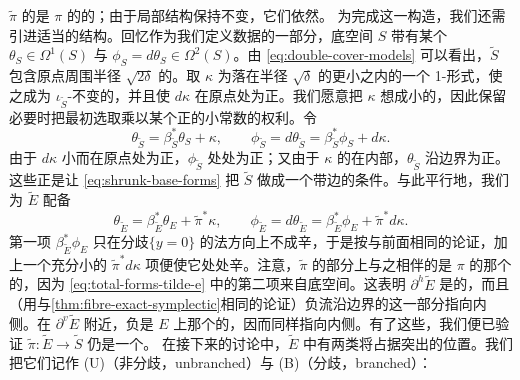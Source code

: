 $\tilde{\pi}$ 的\trCriticalPoint{}是 $\pi$ 的\trCriticalPoint{}的\trPreimage；由于局部结构保持不变，它们依然\trNondegenerate。
为完成这一构造，我们还需引进适当的\trExactSymplectic{}结构。回忆作为我们\trFibration{}定义数据的一部分，底空间 $S$ 带有某个 $\theta_S\in\Omega^1(S)$ 与 $\phi_S=d\theta_S\in\Omega^2(S)$。由 \eqref{eq:double-cover-models} 可以看出，$\widetilde{S}$ 包含原点周围半径 $\sqrt{2\delta}$ 的\trDisk。取 $\kappa$ 为\trSupport{}落在半径 $\sqrt{\delta}$ 的更小\trDisk{}之内的一个 1-形式，使之成为 $\iota_{\widetilde{S}}$-不变的，并且使 $d\kappa$ 在原点处为正。我们愿意把 $\kappa$ 想成小的，因此保留必要时把最初选取乘以某个正的小常数的权利。令
\begin{equation}\label{eq:shrunk-base-forms}
\theta_{\widetilde{S}}=\beta_{\widetilde{S}}^*\theta_S+\kappa,\qquad
\phi_{\widetilde{S}}=d\theta_{\widetilde{S}}=\beta_{\widetilde{S}}^*\phi_S+d\kappa.
\end{equation}
由于 $d\kappa$ 小而在原点处为正，$\phi_{\widetilde{S}}$ 处处为正；又由于 $\kappa$ 的\trSupport{}在内部，$\theta_{\widetilde{S}}$ 沿边界为正。这些正是让 \eqref{eq:shrunk-base-forms} 把 $\widetilde{S}$ 做成一个带边\trExactSymplectic\trManifold{}的条件。与此平行地，我们为 $\widetilde{E}$ 配备
\begin{equation}\label{eq:total-forms-tilde-e}
\theta_{\widetilde{E}}=\beta_{\widetilde{E}}^*\theta_E+\tilde{\pi}^*\kappa,\qquad
\phi_{\widetilde{E}}=d\theta_{\widetilde{E}}=\beta_{\widetilde{E}}^*\phi_E+\tilde{\pi}^*d\kappa.
\end{equation}
第一项 $\beta_{\widetilde{E}}^*\phi_E$ 只在分歧\trFiber{}$\{y=0\}$ 的法方向上不成辛，于是按与前面相同的论证，加上一个充分小的 $\tilde{\pi}^*d\kappa$ 项便使它处处辛。注意，$\tilde{\pi}$ 的\trRegular{}部分上与之相伴的\trSymplectic\trConnection{}是 $\pi$ 的那个的\trPullback，因为 \eqref{eq:total-forms-tilde-e} 中的第二项来自底空间。这表明 $\partial^h\widetilde{E}$ 是\trHorizontal{}的，而且（用与\cref{thm:fibre-exact-symplectic}相同的论证）负\trLiouville{}流沿边界的这一部分指向内侧。在 $\partial^v\widetilde{E}$ 附近，负\trLiouville\trVectorField{}是 $E$ 上那个的\trPullback，因而同样指向内侧。有了这些，我们便已验证 $\tilde{\pi}\colon\widetilde{E}\to\widetilde{S}$ 仍是一个\trExact\trLefschetzFibration。
在接下来的讨论中，$\widetilde{E}$ 中有两类\trExact\trLagrange\trSubmanifold{}将占据突出的位置。我们把它们记作 (U)（非分歧，unbranched）与 (B)（分歧，branched）：
